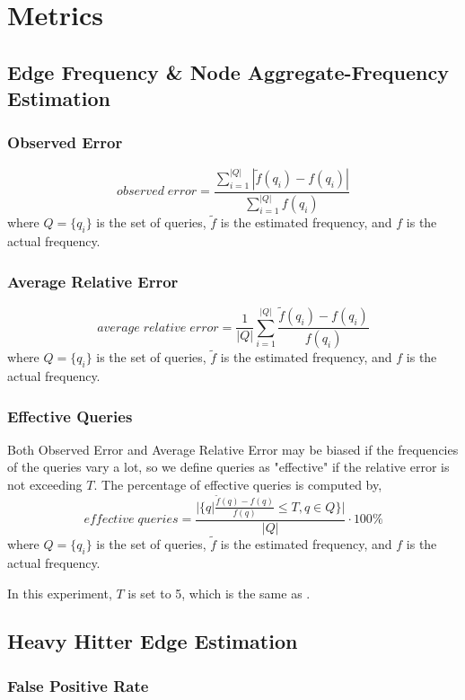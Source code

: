 \section{Metrics}
\subsection{Edge Frequency \& Node Aggregate-Frequency Estimation}
\subsubsection{Observed Error \cite{khan}}
\[
observed\;error = \frac{ \sum_{i=1}^{|Q|}{|\tilde{f}(q_i) - f(q_i)|} }{\sum_{i=1}^{|Q|}f(q_i)}
\]
where $Q = \{q_i\}$ is the set of queries, $\tilde{f}$ is the estimated frequency, and $f$ is the actual frequency.

\subsubsection{Average Relative Error \cite{DBLP}}
\[
average\;relative\;error = \frac{1}{|Q|} \sum_{i=1}^{|Q|} \frac{\tilde{f}(q_i)-f(q_i)}{f(q_i)}
\]
where $Q = \{q_i\}$ is the set of queries, $\tilde{f}$ is the estimated frequency, and $f$ is the actual frequency.

\subsubsection{Effective Queries \cite{DBLP}}
Both Observed Error and Average Relative Error may be biased if the frequencies of the queries vary a lot, so we define queries as "effective" if the relative error is not exceeding $T$. The percentage of effective queries is computed by,
\[
effective\;queries = \frac{|\{q|\frac{\tilde{f}(q)-f(q)}{f(q)} \leq T, q \in Q\}|}{|Q|} \cdot 100\%
\]
where $Q = \{q_i\}$ is the set of queries, $\tilde{f}$ is the estimated frequency, and $f$ is the actual frequency.

In this experiment, $T$ is set to 5, which is the same as \cite{DBLP}.

\subsection{Heavy Hitter Edge Estimation}
\subsubsection{False Positive Rate \cite{khan}}

